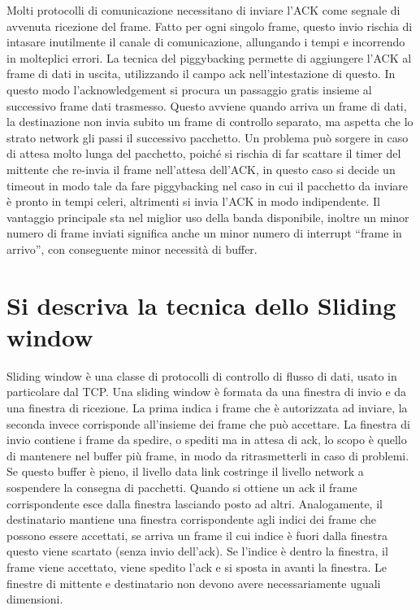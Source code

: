Molti protocolli di comunicazione necessitano di inviare l'ACK come segnale di avvenuta ricezione del frame.
Fatto per ogni singolo frame, questo invio rischia di intasare inutilmente il canale di comunicazione, allungando i tempi e incorrendo in molteplici errori.
La tecnica del piggybacking permette di aggiungere l'ACK al frame di dati in uscita, utilizzando il campo ack nell'intestazione di questo. In questo modo l'acknowledgement si procura un passaggio gratis insieme al successivo frame dati trasmesso.
Questo avviene quando arriva un frame di dati, la destinazione non invia subito un frame di controllo separato, ma aspetta che lo strato network gli passi il successivo pacchetto.
Un problema può sorgere in caso di attesa molto lunga del pacchetto, poiché si rischia di far scattare il timer del mittente che re-invia il frame nell'attesa dell'ACK, in questo caso si decide un timeout in modo tale da fare piggybacking nel caso in cui il pacchetto da inviare è pronto in tempi celeri, altrimenti si invia l'ACK in modo indipendente.
Il vantaggio principale sta nel miglior uso della banda disponibile, inoltre un minor numero di frame inviati significa anche un minor numero di interrupt “frame in arrivo”, con conseguente minor necessità di buffer.

\section{Si descriva la tecnica dello Sliding window}

Sliding window è una classe di protocolli di controllo di flusso di dati, usato in particolare dal TCP.
Una sliding window è formata da una finestra di invio e da una finestra di ricezione. La prima indica i frame che è autorizzata ad inviare, la seconda invece corrisponde all'insieme dei frame che può accettare.
La finestra di invio contiene i frame da spedire, o spediti ma in attesa di ack, lo scopo è quello di mantenere nel buffer più frame, in modo da ritrasmetterli in caso di problemi. Se questo buffer è pieno, il livello data link costringe il livello network a sospendere la consegna di pacchetti. Quando si ottiene un ack il frame corrispondente esce dalla finestra lasciando posto ad altri.
Analogamente, il destinatario mantiene una finestra corrispondente agli indici dei frame che possono essere accettati, se arriva un frame il cui indice è fuori dalla finestra questo viene scartato (senza invio dell'ack). Se l'indice è dentro la finestra, il frame viene accettato, viene spedito l'ack e si sposta in avanti la finestra.
Le finestre di mittente e destinatario non devono avere necessariamente uguali dimensioni.

